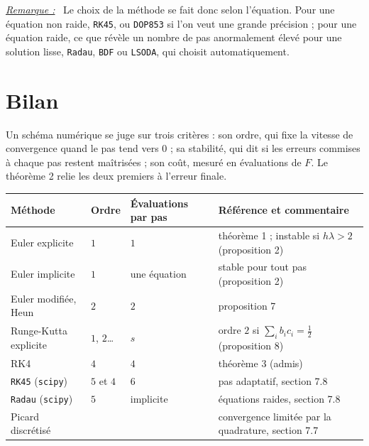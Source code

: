 \documentclass[a4paper,twoside]{report}
\newenvironment{remarque}%
 {\par\needspace{6\baselineskip}\vspace{1mm}\begin{list}{}{\leftmargin=1cm \rightmargin=0.5cm}\item[]%
  \textit{\underline{Remarque :}}~}%
 {\end{list}\vspace{1mm}}
\begin{document}
\begin{remarque}
Le choix de la méthode se fait donc selon l'équation. Pour une équation non raide, \texttt{RK45}, ou \texttt{DOP853} si l'on veut une grande précision ; pour une équation raide, ce que révèle un nombre de pas anormalement élevé pour une solution lisse, \texttt{Radau}, \texttt{BDF} ou \texttt{LSODA}, qui choisit automatiquement.
\end{remarque}
\section{Bilan}

Un schéma numérique se juge sur trois critères : son ordre, qui fixe la vitesse de convergence quand le pas tend vers $0$ ; sa stabilité, qui dit si les erreurs commises à chaque pas restent maîtrisées ; son coût, mesuré en évaluations de $F$. Le théorème 2 relie les deux premiers à l'erreur finale.

\begin{center}
\renewcommand{\arraystretch}{1.35}
\begin{tabularx}{15cm}{|>{\raggedright\arraybackslash}p{3.6cm}|>{\centering\arraybackslash}p{1.4cm}|>{\centering\arraybackslash}p{2.2cm}|>{\raggedright\arraybackslash}X|}
\hline
\rowcolor{couleurD!35} \textbf{Méthode} & \textbf{Ordre} & \textbf{Évaluations par pas} & \textbf{Référence et commentaire} \\ \hline
Euler explicite & $1$ & $1$ & théorème 1 ; instable si $h\lambda > 2$ (proposition 2) \\ \hline
Euler implicite & $1$ & une équation & stable pour tout pas (proposition 2) \\ \hline
Euler modifiée, Heun & $2$ & $2$ & proposition 7 \\ \hline
Runge-Kutta explicite & $1$, $2$\ldots & $s$ & ordre $2$ si $\sum_{i} b_{i}c_{i} = \frac{1}{2}$ (proposition 8) \\ \hline
RK4 & $4$ & $4$ & théorème 3 (admis) \\ \hline
\texttt{RK45} (\texttt{scipy}) & $5$ et $4$ & $6$ & pas adaptatif, section 7.8 \\ \hline
\texttt{Radau} (\texttt{scipy}) & $5$ & implicite & équations raides, section 7.8 \\ \hline
Picard discrétisé & & & convergence limitée par la quadrature, section 7.7 \\ \hline
\end{tabularx}
\end{center}
\end{document}
